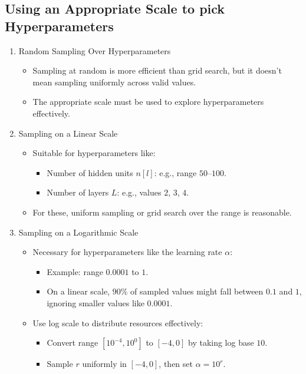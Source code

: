 \documentclass[letterpaper,12pt,notitlepage,twoside]{report}
\begin{document}
\subsection*{Using an Appropriate Scale to pick Hyperparameters}
\begin{enumerate}[noitemsep, topsep=0pt]
\item Random Sampling Over Hyperparameters
\begin{itemize}
    \item Sampling at random is more efficient than grid search, but it doesn’t mean sampling uniformly across valid values.
    \item The appropriate scale must be used to explore hyperparameters effectively.
\end{itemize}

\item Sampling on a Linear Scale
\begin{itemize}
    \item Suitable for hyperparameters like:
    \begin{itemize}
        \item Number of hidden units $n[l]$: e.g., range $50$–$100$.
        \item Number of layers $L$: e.g., values $2$, $3$, $4$.
    \end{itemize}
    \item For these, uniform sampling or grid search over the range is reasonable.
\end{itemize}

\item Sampling on a Logarithmic Scale
\begin{itemize}
    \item Necessary for hyperparameters like the learning rate $\alpha$:
    \begin{itemize}
        \item Example: range $0.0001$ to $1$.
        \item On a linear scale, $90\%$ of sampled values might fall between $0.1$ and $1$, ignoring smaller values like $0.0001$.
    \end{itemize}
    \item Use log scale to distribute resources effectively:
    \begin{itemize}
        \item Convert range $[10^{-4}, 10^0]$ to $[-4, 0]$ by taking log base $10$.
        \item Sample $r$ uniformly in $[-4, 0]$, then set $\alpha = 10^r$.
    \end{itemize}
\end{itemize}


\end{enumerate}
\end{document}
